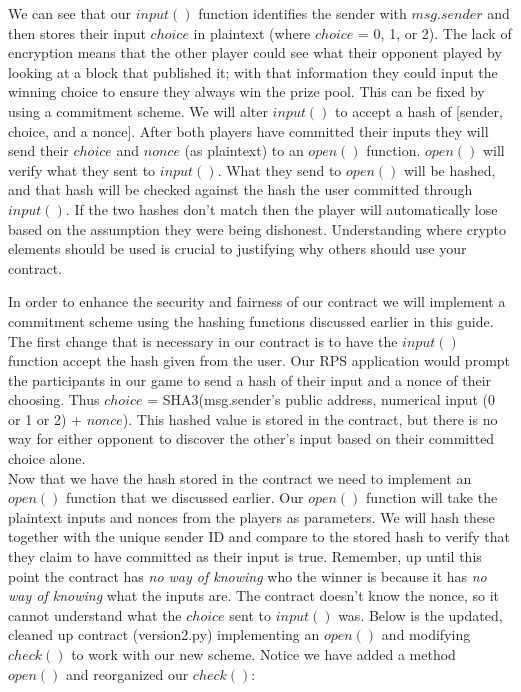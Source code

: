 \documentclass[10pt,twocolumn,letterpaper]{article}
\begin{document}
We can see that our $input()$ function identifies the sender with $msg.sender$ and then stores their input $choice$ in plaintext (where $choice$ = 0, 1, or 2). The lack of encryption means that the other player could see what their opponent played by looking at a block that published it; with that information they could input the winning choice to ensure they always win the prize pool. This can be fixed by using a commitment scheme. We will alter $input()$ to accept a hash of [sender, choice, and a nonce]. After both players have committed their inputs they will send their $choice$ and $nonce$ (as plaintext) to an $open()$ function. $open()$ will verify what they sent to $input()$. What they send to $open()$ will be hashed, and that hash will be checked against the hash the user committed through $input()$. If the two hashes don't match then the player will automatically lose based on the assumption they were being dishonest. Understanding where crypto elements should be used is crucial to justifying why others should use your contract. 

In order to enhance the security and fairness of our contract we will implement a commitment scheme using the hashing functions discussed earlier in this guide. The first change that is necessary in our contract is to have the $input()$ function accept the hash given from the user. Our RPS application would prompt the participants in our game to send a hash of their input and a nonce of their choosing. Thus $choice$ = SHA3(msg.sender's public address, numerical input (0 or 1 or 2) + $nonce$). This hashed value is stored in the contract, but there is no way for either opponent to discover the other's input based on their committed choice alone.\\

Now that we have the hash stored in the contract we need to implement an $open()$ function that we discussed earlier. Our $open()$ function will take the plaintext inputs and nonces from the players as parameters. We will hash these together with the unique sender ID and compare to the stored hash to verify that they claim to have committed as their input is true. Remember, up until this point the contract has \textit{no way of knowing} who the winner is because it has \textit{no way of knowing} what the inputs are. The contract doesn't know the nonce, so it cannot understand what the $choice$ sent to $input()$ was. Below is the updated, cleaned up contract (version2.py) implementing an $open()$ and modifying $check()$ to work with our new scheme. Notice we have added a method $open()$ and reorganized our $check()$:
\end{document}
